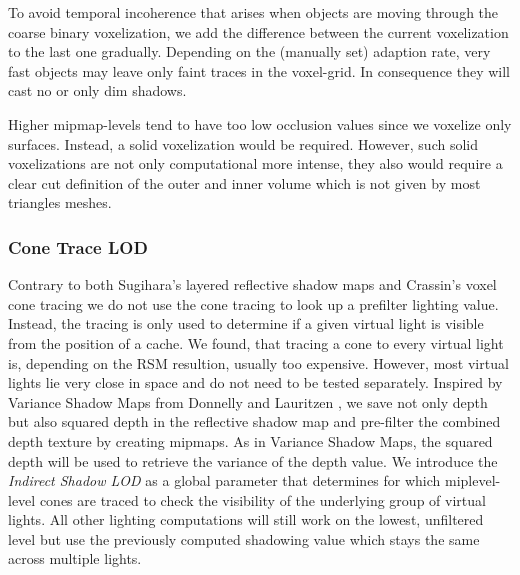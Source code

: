 \documentclass[thesis.tex]{subfiles}
\begin{document}
To avoid temporal incoherence that arises when objects are moving through the coarse binary voxelization, we add the difference between the current voxelization to the last one gradually.
Depending on the (manually set) adaption rate, very fast objects may leave only faint traces in the voxel-grid.
In consequence they will cast no or only dim shadows.

Higher mipmap-levels tend to have too low occlusion values since we voxelize only surfaces.
Instead, a solid voxelization would be required.
However, such solid voxelizations are not only computational more intense, they also would require a clear cut definition of the outer and inner volume which is not given by most triangles meshes.

\subsubsection{Cone Trace LOD}
Contrary to both Sugihara's layered reflective shadow maps and Crassin's voxel cone tracing we do not use the cone tracing to look up a prefilter lighting value.
Instead, the tracing is only used to determine if a given virtual light is visible from the position of a cache.
We found, that tracing a cone to every virtual light is, depending on the RSM resultion, usually too expensive.
However, most virtual lights lie very close in space and do not need to be tested separately.
Inspired by Variance Shadow Maps from Donnelly and Lauritzen \cite{bib:vsm}, we save not only depth but also squared depth in the reflective shadow map and pre-filter the combined depth texture by creating mipmaps.
As in Variance Shadow Maps, the squared depth will be used to retrieve the variance of the depth value.
We introduce the \emph{Indirect Shadow LOD} as a global parameter that determines for which miplevel-level cones are traced to check the visibility of the underlying group of virtual lights. 
All other lighting computations will still work on the lowest, unfiltered level but use the previously computed shadowing value which stays the same across multiple lights.\\
\end{document}
